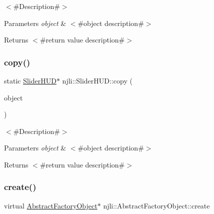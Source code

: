 $<$\#\+Description\#$>$


\begin{DoxyParams}{Parameters}
{\em object} & $<$\#object description\#$>$\\
\hline
\end{DoxyParams}
\begin{DoxyReturn}{Returns}
$<$\#return value description\#$>$ 
\end{DoxyReturn}
\mbox{\label{classnjli_1_1_slider_h_u_d_a144602096b965e2b6e836e752d37e77d}} 
\subsubsection{\texorpdfstring{copy()}{copy()}}
{\footnotesize\ttfamily static \mbox{\hyperlink{classnjli_1_1_slider_h_u_d}{Slider\+H\+UD}}$\ast$ njli\+::\+Slider\+H\+U\+D\+::copy (\begin{DoxyParamCaption}\item[{const \mbox{\hyperlink{classnjli_1_1_slider_h_u_d}{Slider\+H\+UD}} \&}]{object }\end{DoxyParamCaption})\hspace{0.3cm}{\ttfamily [static]}}

$<$\#\+Description\#$>$


\begin{DoxyParams}{Parameters}
{\em object} & $<$\#object description\#$>$\\
\hline
\end{DoxyParams}
\begin{DoxyReturn}{Returns}
$<$\#return value description\#$>$ 
\end{DoxyReturn}
\mbox{\label{classnjli_1_1_slider_h_u_d_a83a8876ae63b92804004cf3febe76573}} 
\subsubsection{\texorpdfstring{create()}{create()}\hspace{0.1cm}{\footnotesize\ttfamily [1/3]}}
{\footnotesize\ttfamily virtual \mbox{\hyperlink{classnjli_1_1_abstract_factory_object}{Abstract\+Factory\+Object}}$\ast$ njli\+::\+Abstract\+Factory\+Object\+::create}

